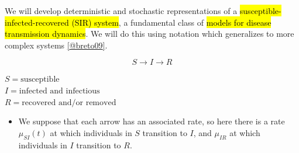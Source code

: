 \documentclass[]{article}
\begin{document}
We will develop deterministic and stochastic representations of a
\hl{susceptible-infected-recovered (SIR) system}, a fundamental class of
\hl{models for disease transmission dynamics}. We will do this using notation
which generalizes to more complex systems
\href{http://dept.stat.lsa.umich.edu/~ionides/pubs/breto09.pdf}{{[}@breto09{]}}.

\hypertarget{htmlwidget-c91d56e95a6c9d1fe971}{}

$$S\longrightarrow I\longrightarrow R $$

\(S = \text{susceptible}\)\\
\(I = \text{infected and infectious}\)\\
\(R = \text{recovered and/or removed}\)

\begin{itemize}
\item
  We suppose that each arrow has an associated rate, so here there is a
  rate \(\mu_{SI}(t)\) at which individuals in \(S\) transition to
  \(I\), and \(\mu_{IR}\) at which individuals in \(I\) transition to
  \(R\).
  
  

\end{itemize}
\end{document}
